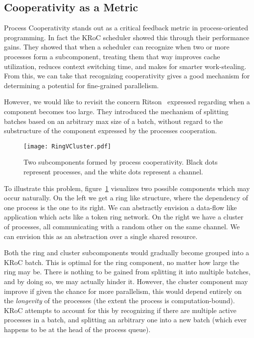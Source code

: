\subsection{Cooperativity as a Metric}

Process Cooperativity stands out as a critical feedback metric in process-oriented
programming. In fact the KRoC scheduler showed this through their performance gains. 
They showed that when a scheduler can recognize when two or more processes form
a subcomponent, treating them that way improves cache utilization, reduces context 
switching time, and makes for smarter work-stealing. 
From this, we can take that recognizing cooperativity gives a good mechanism for
determining a potential for fine-grained parallelism. 

However, we would like to revisit the concern Ritson \etal~expressed regarding 
when a component becomes too large. They introduced the mechanism of splitting
batches based on an arbitrary max size of a batch, without regard to the 
substructure of the component expressed by the processes cooperation.

\begin{figure} 
\centering
\texttt{[image: RingVCluster.pdf]}
\caption{Two subcomponents formed by process cooperativity. Black dots 
represent processes, and the white dots represent a channel.}
\label{fig:RingVCluster}
\end{figure}

To illustrate this problem, figure~\ref{fig:RingVCluster} visualizes two 
possible components which may occur naturally. On the left we get a ring like
structure, where the dependency of one process is the one to its right.
We can abstractly envision a data-flow like application which acts like
a token ring network. On the right we have a cluster of processes, all 
communicating with a random other on the same channel. We can envision this
as an abstraction over a single shared resource.

Both the ring and cluster subcomponents would gradually become grouped into a 
KRoC batch. This is optimal for the ring component, no matter how large the 
ring may be. There is nothing to be gained from splitting it into multiple 
batches, and by doing so, we may actually hinder it. However, the cluster 
component may improve if given the chance for more parallelism, this would
depend entirely on the {\em longevity} of the processes (\ie the extent the process is computation-bound).
KRoC attempts to account for this by recognizing if there are multiple active
processes in a batch, and splitting an arbitrary one into a new batch (which
ever happens to be at the head of the process queue). 

